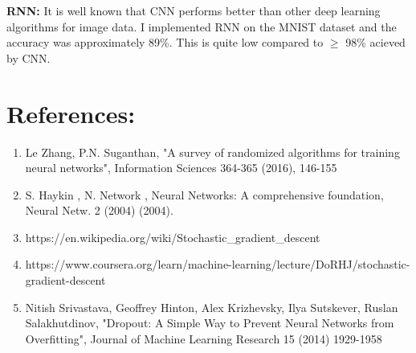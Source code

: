\documentclass{article}
\begin{document}
\textbf{RNN:}
It is well known that CNN performs better than other deep learning algorithms for image data. I implemented RNN on the MNIST dataset and the accuracy was approximately 89\%. This is quite low compared to $\geq$ 98\% acieved by CNN.
 
 
 
\section*{References:}
\begin{enumerate}
\item Le Zhang, P.N. Suganthan, "A survey of randomized algorithms for training neural networks", Information Sciences 364-365 (2016), 146-155  

\item S. Haykin , N. Network , Neural Networks: A comprehensive foundation, Neural Netw. 2 (2004) (2004). 

\item https://en.wikipedia.org/wiki/Stochastic\_gradient\_descent

\item https://www.coursera.org/learn/machine-learning/lecture/DoRHJ/stochastic-gradient-descent

\item Nitish Srivastava, Geoffrey Hinton, Alex Krizhevsky, Ilya Sutskever, Ruslan Salakhutdinov, "Dropout: A Simple Way to Prevent Neural Networks from Overfitting", Journal of Machine Learning Research 15 (2014) 1929-1958

\end{enumerate}
\end{document}
